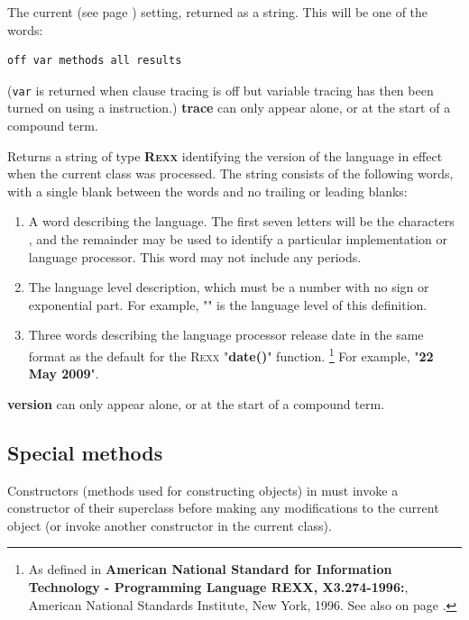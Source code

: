 \begin{description}
The current   (see page \pageref{reftrace})  setting,
returned as a \nr{} string.
This will be one of the words:
\begin{lstlisting}
off var methods all results
\end{lstlisting}

(\texttt{var} is returned when clause tracing is off but variable
tracing has then been turned on using a  instruction.)
 \textbf{trace} can only appear alone, or at the start of a
compound term.
\item[version]\label{refswvers}
 
Returns a string of type \textbf{R\textsc{exx}} identifying the version of the
\nr{} language in effect when the current class was processed.
The string consists of the following words, with a single blank between
the words and no trailing or leading blanks:
\begin{enumerate}
\item A word describing the language.  The first seven letters will be the
characters \textbf{\nr{}}, and the remainder may be used to identify
a particular implementation or language processor.
This word may not include any periods.
\item 
The language level description, which must be a number with no sign or
exponential part.
For example, "\textbf{}" is the language level of this
definition.
\item 
Three words describing the language processor release date in
the same format as the default for the R\textsc{exx} "\textbf{date()}"
function.
\footnote{
As defined in \textbf{American National Standard for Information
Technology - Programming Language REXX, X3.274-1996:}, American
National Standards Institute, New York, 1996. See also
 on page \pageref{refrexxdate}.
}
For example, "\textbf{22 May 2009}".
\end{enumerate}
 \textbf{version} can only appear alone, or at the start of a
compound term.
\end{description}
\subsection{Special methods}\label{refspecm}
 
Constructors (methods used for constructing objects) in \nr{}
must invoke a constructor of their superclass before making any
modifications to the current object (or invoke another constructor in
the current class).
 
